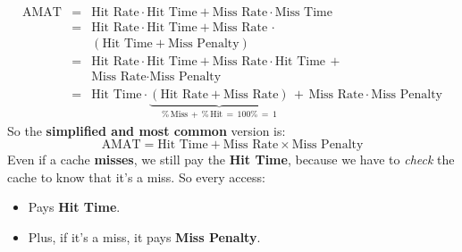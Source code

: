 \begin{equation*}
    \begin{array}{rcl}
        \text{AMAT} &=& \text{Hit Rate} \cdot \text{Hit Time} + \text{Miss Rate} \cdot \text{Miss Time} \\ [.7em]
        &=& \text{Hit Rate} \cdot \text{Hit Time} + \text{Miss Rate} \, \cdot \\ [.3em]
        &&  \left(\text{Hit Time} + \text{Miss Penalty}\right) \\ [.7em]
        &=& \text{Hit Rate} \cdot \text{Hit Time} + \text{Miss Rate} \cdot \text{Hit Time} \, + \\ [.3em]
        &&  \text{Miss Rate} \cdot \text{Miss Penalty} \\ [.7em]
        &=& \text{Hit Time} \cdot \underbrace{\left(\text{Hit Rate} + \text{Miss Rate}\right)}_{\% \, \text{Miss} \, + \, \% \, \text{Hit} \, = \, 100\% \, = \, 1} \, + \, \text{Miss Rate} \cdot \text{Miss Penalty}
    \end{array}
\end{equation*}
So the \textbf{simplified and most common} version is:
\begin{equation}
    \text{AMAT} = \text{Hit Time} + \text{Miss Rate} \times \text{Miss Penalty}
\end{equation}
Even if a cache \textbf{misses}, we still pay the \textbf{Hit Time}, because we have to \emph{check} the cache to know that it's a miss. So every access:
\begin{itemize}
    \item[\textcolor{Red2}{\faIcon{thumbs-down}}] Pays \textbf{Hit Time}.
    \item[\textcolor{Red2}{\faIcon{thumbs-down}}] Plus, if it's a miss, it pays \textbf{Miss Penalty}.
\end{itemize}
